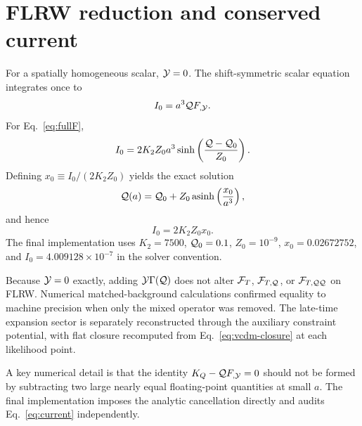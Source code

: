 \section{FLRW reduction and conserved current}\label{app:flrw}
For a spatially homogeneous scalar, $\mathcal{Y}=0$. The shift-symmetric scalar equation integrates once to
\begin{equation}
I_0=a^3\mathcal{Q} F_{,\mathcal{Y}}.
\label{eq:current}
\end{equation}
For Eq.~\eqref{eq:fullF},
\begin{equation}
I_0=2K_2Z_0a^3\sinh\left(\frac{\mathcal{Q}-\mathcal{Q}_0}{Z_0}\right).
\end{equation}
Defining $x_0\equiv I_0/(2K_2Z_0)$ yields the exact solution
\begin{equation}
\mathcal{Q}(a)=\mathcal{Q}_0+Z_0\operatorname{asinh}\left(\frac{x_0}{a^3}\right),
\label{eq:Qa}
\end{equation}
and hence
\begin{equation}
I_0=2K_2Z_0x_0.
\end{equation}
The final implementation uses $K_2=7500$, $\mathcal{Q}_0=0.1$, $Z_0=10^{-9}$, $x_0=0.02672752$, and $I_0=4.009128\times10^{-7}$ in the solver convention.

Because $\mathcal{Y}=0$ exactly, adding $\mathcal{Y}\Gamma(\mathcal{Q})$ does not alter $\mathcal{F}_{T}$, $\mathcal F_{T,\mathcal{Q}}$, or $\mathcal F_{T,\mathcal{Q}\mathcal{Q}}$ on FLRW. Numerical matched-background calculations confirmed equality to machine precision when only the mixed operator was removed. The late-time expansion sector is separately reconstructed through the auxiliary constraint potential, with flat closure recomputed from Eq.~\eqref{eq:vcdm-closure} at each likelihood point.

A key numerical detail is that the identity $K_Q-\mathcal{Q} F_{,\mathcal{Y}}=0$ should not be formed by subtracting two large nearly equal floating-point quantities at small $a$. The final implementation imposes the analytic cancellation directly and audits Eq.~\eqref{eq:current} independently.
